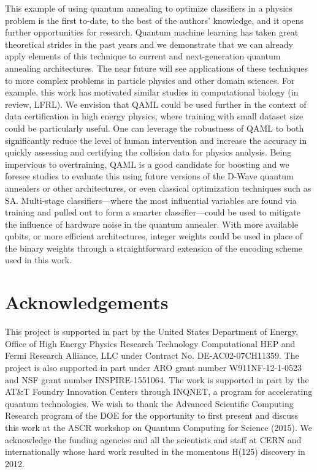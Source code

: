 \documentclass[.chapters/Higgs/.chapters/Higgs/main.tex]{subfiles}
\begin{document}
This example of using quantum annealing to optimize classifiers in a physics problem is the first to-date, to the best of the authors' knowledge, and it opens further opportunities for research. Quantum machine learning has taken great theoretical strides in the past years  \cite{Lloyd:2014fk,Wiebe:2014vn,Paparo:2014kx,Rebentrost:2014uq,Schuld:2014eu,Cong:2015zr,Biamonte:2016aa} and we demonstrate that we can already apply elements of this technique to current and next-generation quantum annealing architectures. The near future will see applications of these techniques to more complex problems in particle physics and other domain sciences. For example, this work has motivated similar studies in computational biology (in review, LFRL).%
We envision that QAML could be used further in the context of data certification in high energy physics,
where training with small dataset size could be particularly useful. One can leverage the robustness of QAML to 
both significantly reduce the level of human intervention and increase the accuracy in quickly assessing and certifying the collision data 
for physics analysis. Being impervious to overtraining, QAML is a good candidate for boosting\cite{xgboost}
and we foresee studies to evaluate this using future versions of the D-Wave quantum annealers or other architectures, or even classical optimization techniques such as SA. 
Multi-stage classifiers---where the most influential variables are found via training and pulled out to form a smarter classifier---could be used to mitigate the influence of hardware noise in the quantum annealer.  With more available qubits, or more efficient architectures, integer weights could be used in place of the binary weights through a straightforward extension of the encoding scheme used in this work. 


\section*{Acknowledgements}
This project is supported in part by the  United States Department of Energy, Office of High Energy Physics Research Technology Computational HEP and Fermi Research Alliance, LLC under Contract No. DE-AC02-07CH11359.  The project is also supported in part under ARO grant number W911NF-12-1-0523 and NSF grant number INSPIRE-1551064. The work is supported in part by the AT\&T Foundry Innovation Centers through INQNET, a program for accelerating quantum technologies.  We wish to thank the Advanced Scientific Computing Research program of the DOE for the opportunity to first present and discuss this work at the ASCR workshop on Quantum Computing for Science (2015). We  acknowledge the funding agencies and all the scientists and staff at CERN and internationally whose  hard work resulted in the momentous H(125) discovery in 2012. 
\end{document}
